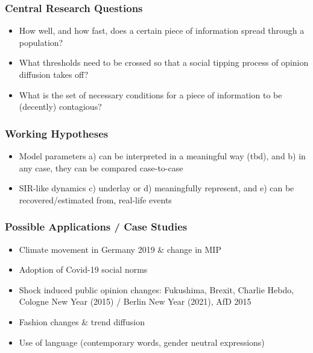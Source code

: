 \documentclass[
  12pt,
]{article}
\providecommand{\tightlist}{%
  \setlength{\itemsep}{0pt}\setlength{\parskip}{0pt}}
\numberwithin{equation}{section}
\numberwithin{table}{section}
\numberwithin{figure}{section}
\begin{document}
\hypertarget{central-research-questions}{%
\subsubsection{Central Research
Questions}\label{central-research-questions}}

\begin{itemize}
\tightlist
\item
  How well, and how fast, does a certain piece of information spread
  through a population?
\item
  What thresholds need to be crossed so that a social tipping process of
  opinion diffusion takes off?
\item
  What is the set of necessary conditions for a piece of information to
  be (decently) contagious?
\end{itemize}

\hypertarget{working-hypotheses}{%
\subsubsection{Working Hypotheses}\label{working-hypotheses}}

\begin{itemize}
\tightlist
\item
  Model parameters a) can be interpreted in a meaningful way (tbd), and
  b) in any case, they can be compared case-to-case
\item
  SIR-like dynamics c) underlay or d) meaningfully represent, and e) can
  be recovered/estimated from, real-life events
\end{itemize}

\hypertarget{possible-applications-case-studies}{%
\subsubsection{Possible Applications / Case
Studies}\label{possible-applications-case-studies}}

\begin{itemize}
\tightlist
\item
  Climate movement in Germany 2019 \& change in MIP
\item
  Adoption of Covid-19 social norms
\item
  Shock induced public opinion changes: Fukushima, Brexit, Charlie
  Hebdo, Cologne New Year (2015) / Berlin New Year (2021), AfD 2015
\item
  Fashion changes \& trend diffusion
\item
  Use of language (contemporary words, gender neutral expressions)
\end{itemize}
\end{document}
